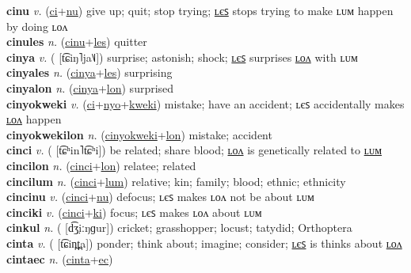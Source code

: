 \textbf{cinu} \textit{v.} (\hyperref[ci]{ci}+\hyperref[nu]{nu})
give up; quit; stop trying; \hyperref[cinules]{ʟєꜱ} stops trying to make ʟᴜᴍ happen by doing ʟᴏᴧ \label{cinu} \\
\textbf{cinules} \textit{n.} (\hyperref[cinu]{cinu}+\hyperref[les]{les})
quitter \label{cinules} \\
\textbf{cinya} \textit{v.} ( [t͡ɕiŋ˥ja˥˩])
surprise; astonish; shock; \hyperref[cinyales]{ʟєꜱ} surprises \hyperref[cinyalon]{ʟᴏᴧ} with ʟᴜᴍ \label{cinya} \\
\textbf{cinyales} \textit{n.} (\hyperref[cinya]{cinya}+\hyperref[les]{les})
surprising \label{cinyales} \\
\textbf{cinyalon} \textit{n.} (\hyperref[cinya]{cinya}+\hyperref[lon]{lon})
surprised \label{cinyalon} \\
\textbf{cinyokweki} \textit{v.} (\hyperref[ci]{ci}+\hyperref[nyo]{nyo}+\hyperref[kweki]{kweki})
mistake; have an accident; ʟєꜱ accidentally makes \hyperref[cinyokwekilon]{ʟᴏᴧ} happen \label{cinyokweki} \\
\textbf{cinyokwekilon} \textit{n.} (\hyperref[cinyokweki]{cinyokweki}+\hyperref[lon]{lon})
mistake; accident \label{cinyokwekilon} \\
\textbf{cinci} \textit{v.} ( [t͡ɕʰin˥t͡ɕʰi])
be related; share blood; \hyperref[cincilon]{ʟᴏᴧ} is genetically related to \hyperref[cincilum]{ʟᴜᴍ} \label{cinci} \\
\textbf{cincilon} \textit{n.} (\hyperref[cinci]{cinci}+\hyperref[lon]{lon})
relatee; related \label{cincilon} \\
\textbf{cincilum} \textit{n.} (\hyperref[cinci]{cinci}+\hyperref[lum]{lum})
relative; kin; family; blood; ethnic; ethnicity \label{cincilum} \\
\textbf{cincinu} \textit{v.} (\hyperref[cinci]{cinci}+\hyperref[nu]{nu})
defocus; ʟєꜱ makes ʟᴏᴧ not be about ʟᴜᴍ \label{cincinu} \\
\textbf{cinciki} \textit{v.} (\hyperref[cinci]{cinci}+\hyperref[ki]{ki})
focus; ʟєꜱ makes ʟᴏᴧ about ʟᴜᴍ \label{cinciki} \\
\textbf{cinkul} \textit{n.} ( [d͡ʒ̤iːŋɡur])
cricket; grasshopper; locust; tatydid; Orthoptera \label{cinkul} \\
\textbf{cinta} \textit{v.} ( [t͡ɕin̪t̪a])
ponder; think about; imagine; consider; \hyperref[cintales]{ʟєꜱ} is thinks about \hyperref[cintalon]{ʟᴏᴧ} \label{cinta} \\
\textbf{cintaec} \textit{n.} (\hyperref[cinta]{cinta}+\hyperref[ec]{ec})
